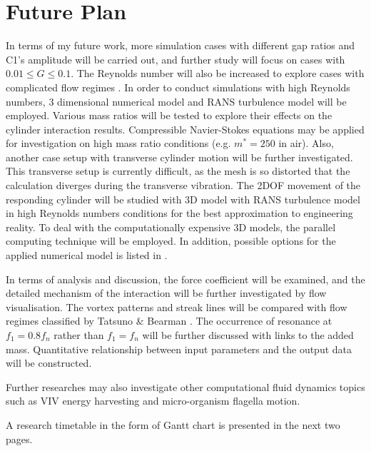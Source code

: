 \section{Future Plan} \label{sec future work}
In terms of my future work, more simulation cases with different gap ratios and C1's amplitude will be carried out, and further study will focus on cases with $ 0.01 \leq G \leq 0.1 $. The Reynolds number will also be increased to explore cases with complicated flow regimes \cite{tatsuno1990visual}. In order to conduct simulations with high Reynolds numbers, 3 dimensional numerical model and RANS turbulence model will be employed. Various mass ratios will be tested to explore their effects on the cylinder interaction results. Compressible Navier-Stokes equations may be applied for investigation on high mass ratio conditions (e.g. $ m^*=250 $ in air). Also, another case setup with transverse cylinder motion will be further investigated. This transverse setup is currently difficult, as the mesh is so distorted that the calculation diverges during the transverse vibration. The 2DOF movement of the responding cylinder will be studied with 3D model with RANS turbulence model in high Reynolds numbers conditions for the best approximation to engineering reality. To deal with the computationally expensive 3D models, the parallel computing technique will be employed. In addition, possible options for the applied numerical model is listed in .
  
In terms of analysis and discussion, the force coefficient will be examined, and the detailed mechanism of the interaction will be further investigated by flow visualisation. The vortex patterns and streak lines will be compared with flow regimes classified by Tatsuno \& Bearman \cite{tatsuno1990visual}. The occurrence of resonance at $ f_1=0.8f_n $ rather than $ f_1=f_n $ will be further discussed with links to the added mass. Quantitative relationship between input parameters and the output data will be constructed.

Further researches may also investigate other computational fluid dynamics topics such as VIV energy harvesting and micro-organism flagella motion.
 
A research timetable in the form of Gantt chart is presented in the next two pages. 
 
